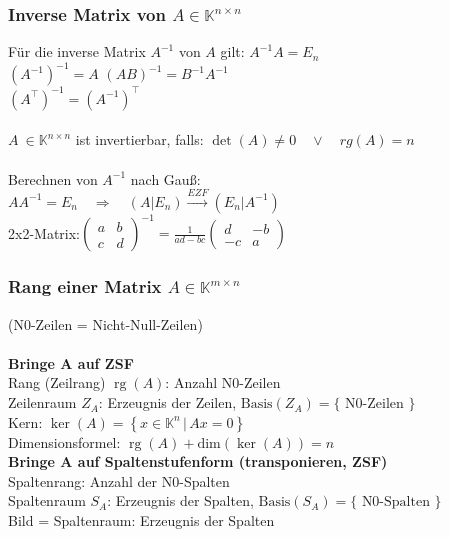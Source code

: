 \documentclass[6pt,a4paper]{scrartcl}
\newcommand{\dme}[2]{\ensuremath{\left\{#1\,\vert\,#2 \right\}}}
\newcommand{\enbrace}[1]{\ensuremath{\left(#1\right)}}
\DeclareMathOperator{\rg}{rg}
\begin{document}
\begin{multicols*}{4}
\subsubsection{Inverse Matrix von $A\in \mathbb K^{n\times n}$}
Für die inverse Matrix $A^{-1}$ von $A$ gilt: $A^{-1}A=E_n$\\
$(A^{-1})^{-1}=A$ \qquad $(AB)^{-1}=B^{-1}A^{-1}$ \\
$(A^\top)^{-1}=(A^{-1})^\top$\\
\\
$A\ \in \mathbb K^{n\times n}$ ist invertierbar, falls: $\det (A) \ne 0 \quad \lor \quad rg(A)=n$\\
\\
Berechnen von $A^{-1}$ nach Gauß:\\
$AA^{-1}=E_n\quad\Rightarrow\quad (A|E_n)\overset{EZF}{\longrightarrow}(E_n|A^{-1})$\\
2x2-Matrix:$\enbrace{\begin{matrix}
a & b \\
c & d
\end{matrix}}^{-1} = \frac{1}{ad-bc}\begin{pmatrix}
d & -b \\
-c & a
\end{pmatrix}$

\subsubsection{Rang einer Matrix $A\in \mathbb K^{m\times n}$}
{\tiny (N0-Zeilen = Nicht-Null-Zeilen)}\\ \\
\textbf{Bringe A auf ZSF} \\
Rang (Zeilrang) $\rg(A)$: Anzahl N0-Zeilen \\     
Zeilenraum $Z_A$: Erzeugnis der Zeilen, $\text{Basis}(Z_A) = \{\text{ N0-Zeilen }\}$ \\
Kern: $\ker(A) = \dme{x \in \mathbb K^n}{Ax= 0}$ \\
Dimensionsformel: $\rg(A) + \mathrm{dim}(\ker(A)) = n$ \\
\textbf{Bringe A auf Spaltenstufenform (transponieren, ZSF)} \\
Spaltenrang: Anzahl der N0-Spalten\\
Spaltenraum $S_A$: Erzeugnis der Spalten, $\text{Basis}(S_A) = \{\text{ N0-Spalten }\}$ \\
Bild = Spaltenraum: Erzeugnis der Spalten 

\end{multicols*}
\end{document}
